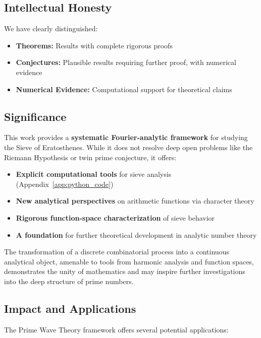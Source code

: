 ﻿\documentclass[12pt,a4paper]{report}
\theoremstyle{plain}
\theoremstyle{definition}
\begin{document}
\subsection*{Intellectual Honesty}

We have clearly distinguished:
\begin{itemize}
    \item \textbf{Theorems:} Results with complete rigorous proofs
    \item \textbf{Conjectures:} Plausible results requiring further proof, with numerical evidence
    \item \textbf{Numerical Evidence:} Computational support for theoretical claims
\end{itemize}

\subsection*{Significance}

This work provides a \textbf{systematic Fourier-analytic framework} for studying the Sieve of Eratosthenes. While it does not resolve deep open problems like the Riemann Hypothesis or twin prime conjecture, it offers:

\begin{itemize}
    \item \textbf{Explicit computational tools} for sieve analysis (Appendix~\ref{app:python_code})
    \item \textbf{New analytical perspectives} on arithmetic functions via character theory
    \item \textbf{Rigorous function-space characterization} of sieve behavior
    \item \textbf{A foundation} for further theoretical development in analytic number theory
\end{itemize}

The transformation of a discrete combinatorial process into a continuous analytical object, amenable to tools from harmonic analysis and function spaces, demonstrates the unity of mathematics and may inspire further investigations into the deep structure of prime numbers.

\subsection*{Impact and Applications}

The Prime Wave Theory framework offers several potential applications:
\end{document}
